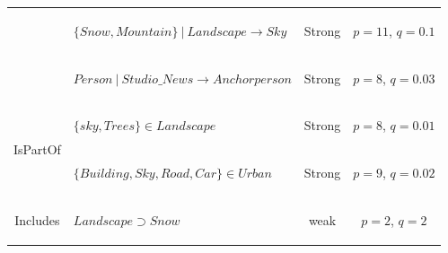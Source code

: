 \begin{table}
\begin{tabular}{c|l|c|c}
					& 
					\begin{small}$\{Snow, Mountain\}~|~Landscape \longrightarrow  Sky$\end{small}&
					\begin{small}Strong\end{small}&
					\begin{small}$p=11$, $q=0.1$\end{small}\\
					
					& 
					\begin{small}$Person~|~Studio\_News \longrightarrow  Anchorperson$\end{small}&
					\begin{small}Strong\end{small}&
					\begin{small}$p=8$, $q=0.03$\end{small}\\
							
					\hline 
	
					
					\multirow{2}{*}{\begin{small}IsPartOf\end{small}}&
					\begin{small}$\{sky,Trees\} \in Landscape$\end{small}&
					\begin{small}Strong\end{small}&
					\begin{small}$p=8$, $q=0.01$\end{small}\\

					& 
					\begin{small}$\{Building,Sky,Road,Car\} \in Urban$ \end{small}&
					\begin{small}Strong\end{small}&
					\begin{small}$p=9$, $q=0.02$\end{small}\\

					\hline 

					\begin{small}Includes\end{small}&
					\begin{small}$Landscape  \supset Snow$\end{small}&
					\begin{small}weak\end{small}&
					\begin{small}$p=2$, $q=2$\end{small}\\

					\hline 
				\end{tabular}
			\end{table}

